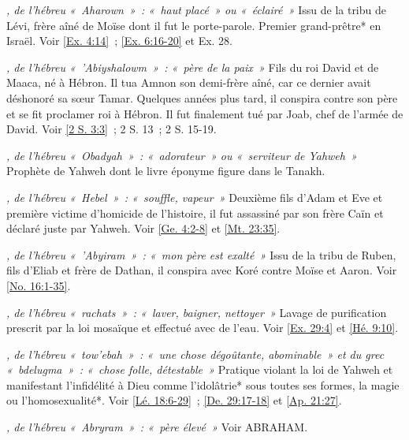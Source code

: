 \begin{multicols}{2}
\textit{, de l'hébreu «~Aharown~»~: «~haut placé~» ou «~éclairé~»}\newline
Issu de la tribu de Lévi, frère aîné de Moïse dont il fut le porte-parole. Premier grand-prêtre* en Israël. Voir \vref{Ex. 4:14}~; \vref{Ex. 6:16-20} et Ex. 28.

\textit{, de l'hébreu «~'Abiyshalowm~»~: «~père de la paix~»}\newline
Fils du roi David et de Maaca, né à Hébron. Il tua Amnon son demi-frère aîné, car ce dernier avait déshonoré sa sœur Tamar. Quelques années plus tard, il conspira contre son père et se fit proclamer roi à Hébron. Il fut finalement tué par Joab, chef de l'armée de David. Voir \vref{2 S. 3:3}~; 2 S. 13~; 2 S. 15-19.

\textit{, de l'hébreu «~Obadyah~»~: «~adorateur~» ou «~serviteur de Yahweh~»}\newline
Prophète de Yahweh dont le livre éponyme figure dans le Tanakh.

\textit{, de l'hébreu «~Hebel~»~: «~souffle, vapeur~»}\newline
Deuxième fils d'Adam et Eve et première victime d'homicide de l'histoire, il fut assassiné par son frère Caïn et déclaré juste par Yahweh. Voir \vref{Ge. 4:2-8} et \vref{Mt. 23:35}.

\textit{, de l'hébreu «~'Abyiram~»~: «~mon père est exalté~»}\newline
Issu de la tribu de Ruben, fils d'Eliab et frère de Dathan, il conspira avec Koré contre Moïse et Aaron. Voir \vref{No. 16:1-35}.

\textit{, de l'hébreu «~rachats~»~: «~laver, baigner, nettoyer~»}\newline
Lavage de purification prescrit par la loi mosaïque et effectué avec de l'eau. Voir \vref{Ex. 29:4} et \vref{Hé. 9:10}.

\textit{, de l'hébreu «~tow'ebah~»~: «~une chose dégoûtante, abominable~» et du grec «~bdelugma~»~: «~chose folle, détestable~»}\newline
Pratique violant la loi de Yahweh et manifestant l'infidélité à Dieu comme l'idolâtrie* sous toutes ses formes, la magie ou l'homosexualité*. Voir \vref{Lé. 18:6-29}~; \vref{De. 29:17-18} et \vref{Ap. 21:27}.

\textit{, de l'hébreu «~Abryram~»~: «~père élevé~»}\newline
Voir ABRAHAM.


\end{multicols}
